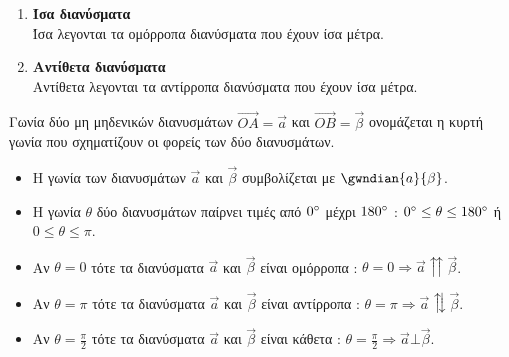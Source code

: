 \documentclass[twoside,nofonts,internet,shmeiwseis]{thewria}
\begin{document}
\vspace{-5mm}
\begin{enumerate}[itemsep=0mm]
\item \textbf{Ίσα διανύσματα}\\
Ίσα λεγονται τα ομόρροπα διανύσματα που έχουν ίσα μέτρα.
\item \textbf{Αντίθετα διανύσματα}\\
Αντίθετα λεγονται τα αντίρροπα διανύσματα που έχουν ίσα μέτρα.
\end{enumerate}
Γωνία δύο μη μηδενικών διανυσμάτων $ \overrightarrow{OA}=\vec{a} $ και $ \overrightarrow{OB}=\vec{\beta} $ ονομάζεται η κυρτή γωνία που σχηματίζουν οι φορείς των δύο διανυσμάτων.
\begin{itemize}[itemsep=0mm]
\item Η γωνία των διανυσμάτων $ \vec{a} $ και $ \vec{\beta} $ συμβολίζεται με $ \gwndian{a}{\beta} $.
\item Η γωνία $ \theta $ δύο διανυσμάτων παίρνει τιμές από $ 0\degree $ μέχρι $ 180\degree $ : $ 0\degree\leq\theta\leq 180\degree $ ή $ 0\leq\theta\leq \pi $.
\item Αν $ \theta=0 $ τότε τα διανύσματα $ \vec{a} $ και $ \vec{\beta} $ είναι ομόρροπα : $ \theta=0\Rightarrow \vec{a}\upuparrows \vec{\beta} $.
\item Αν $ \theta=\pi $ τότε τα διανύσματα $ \vec{a} $ και $ \vec{\beta} $ είναι αντίρροπα : $ \theta=\pi\Rightarrow \vec{a}\updownarrows \vec{\beta} $.
\item Αν $ \theta=\frac{\pi}{2} $ τότε τα διανύσματα $ \vec{a} $ και $ \vec{\beta} $ είναι κάθετα : $ \theta=\frac{\pi}{2}\Rightarrow \vec{a}\bot \vec{\beta} $.
\end{itemize}
\end{document}
